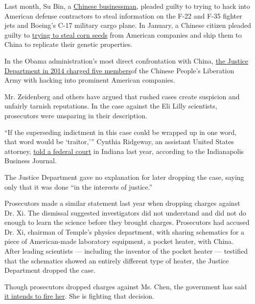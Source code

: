 Last month, Su Bin, a
\href{http://bigstory.ap.org/article/2eb94d3ffb764e81bddac91c948e1956/chinese-man-pleads-guilty-us-hacking-case}{Chinese
businessman}, pleaded guilty to trying to hack into American defense
contractors to steal information on the F-22 and F-35 fighter jets and
Boeing's C-17 military cargo plane. In January, a Chinese citizen
pleaded guilty to
\href{http://www.nytimes.com/2016/01/29/business/international/china-us-monsanto-dupont-corn.html}{trying
to steal corn seeds} from American companies and ship them to China to
replicate their genetic properties.

In the Obama administration's most direct confrontation with China,
\href{http://www.nytimes.com/2014/05/22/world/asia/hacking-charges-threaten-further-damage-to-chinese-american-relations.html}{the
Justice Department in 2014 charged five members}of the Chinese People's
Liberation Army with hacking into prominent American companies.

Mr. Zeidenberg and others have argued that rushed cases create suspicion
and unfairly tarnish reputations. In the case against the Eli Lilly
scientists, prosecutors were unsparing in their description.

``If the superseding indictment in this case could be wrapped up in one
word, that word would be `traitor,''' Cynthia Ridgeway, an assistant
United States attorney,
\href{http://www.ibj.com/articles/43949-lilly-scientists-stole-55-million-in-trade-secrets-indictment-alleges}{told
a federal court} in Indiana last year, according to the Indianapolis
Business Journal.

The Justice Department gave no explanation for later dropping the case,
saying only that it was done ``in the interests of justice.''

Prosecutors made a similar statement last year when dropping charges
against Dr. Xi. The dismissal suggested investigators did not understand
and did not do enough to learn the science before they brought charges.
Prosecutors had accused Dr. Xi, chairman of Temple's physics department,
with sharing schematics for a piece of American-made laboratory
equipment, a pocket heater, with China. After leading scientists ---
including the inventor of the pocket heater --- testified that the
schematics showed an entirely different type of heater, the Justice
Department dropped the case.

Though prosecutors dropped charges against Ms. Chen, the government has
said
\href{http://www.nytimes.com/2015/09/16/technology/chinese-american-cleared-of-spying-charges-now-faces-firing.html}{it
intends to fire her}. She is fighting that decision.

